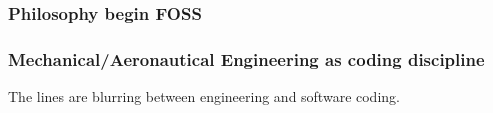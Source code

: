 \documentclass{beamer}
\begin{document}
\begin{frame}
\frametitle{Philosophy begin FOSS}



\end{frame}

\begin{frame}
\frametitle{Mechanical/Aeronautical Engineering as coding discipline}

The lines are blurring between engineering and software coding.


\end{frame}

\end{document}
